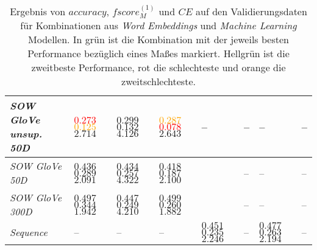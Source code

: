 \documentclass[a4paper,11pt]{article}
\begin{document}
\begin{table}[ht]
\begin{center}
\begin{tabular}{|m{2cm}||m{1.4cm}m{1.4cm}m{1.4cm}m{1.4cm}m{1.4cm}m{1.4cm}m{1.4cm}|}
 \hline
\textit{SOW GloVe unsup. 50D} & \textcolor{red}{$0.273$} \newline \textcolor{orange}{$0.125$} \newline $2.714$ & $0.299$ \newline $0.132$ \newline $4.126$ & \textcolor{orange}{$0.287$} \newline \textcolor{red}{$0.078$} \newline $2.643$ & -- & -- & -- & -- \\
 \hline
\textit{SOW GloVe 50D} & $0.436$ \newline $0.289$ \newline $2.091$ & $0.434$ \newline $0.257$ \newline $4.322$ & $0.418$ \newline $0.187$ \newline $2.100$ & & -- & -- & -- \\
 \hline
\textit{SOW GloVe 300D}  & $0.497$ \newline $0.344$ \newline $1.942$ & $0.447$ \newline $0.249$ \newline $4.210$ & $0.499$ \newline $0.260$ \newline $1.882$ & & -- & -- & -- \\
 \hline
\textit{Sequence} & -- & -- & -- & $0.451$ \newline $0.235$ \newline $2.246$ & -- & $0.477$ \newline $0.263$ \newline $2.194$ & -- \\
   \hline
\end{tabular}

  \caption{Ergebnis von $accuracy$, $fscore_M^{(1)}$ und $CE$ auf den Validierungsdaten für Kombinationen aus \textit{Word Embeddings} und \textit{Machine Learning} Modellen. In grün ist die Kombination mit der jeweils besten Performance bezüglich eines Maßes markiert. Hellgrün ist die zweitbeste Performance, rot die schlechteste und orange die zweitschlechteste.}  
  \label{tab:preselection}
\end{center}
\end{table}
\end{document}
